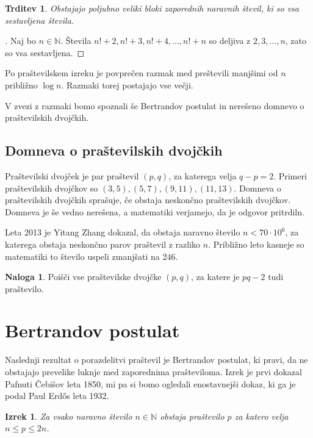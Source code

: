 \documentclass[a4paper,12pt]{article}
\def\N{\mathbb{N}}
\theoremstyle{definition}
\newtheorem{naloga}{Naloga}
\theoremstyle{plain}
\newtheorem{izrek}{Izrek}
\newtheorem{trditev}{Trditev}
\newenvironment{dokaz}{\begin{proof}[\bfseries\upshape\proofname]}{\end{proof}}
\begin{document}
\begin{trditev}
    Obstajajo poljubno veliki bloki zaporednih naravnih števil, ki so vsa sestavljena števila.
\end{trditev}
\begin{dokaz}
    Naj bo $n \in \N$. Števila $n! + 2, n! + 3, n! + 4, \ldots, n! + n$ so deljiva z $2, 3, \ldots, n$, zato so vsa sestavljena.
\end{dokaz}

Po praštevilskem izreku je povprečen razmak med preštevili manjšimi od $n$ približno $\log{n}$. Razmaki torej postajajo vse večji.

V zvezi z razmaki bomo spoznali še Bertrandov postulat in nerešeno domnevo o praštevilskih dvojčkih.

\subsection{Domneva o praštevilskih dvojčkih}
Praštevilski dvojček je par praštevil $(p, q)$, za katerega velja $q - p = 2$. Primeri praštevilskih dvojčkov so $(3, 5), (5, 7), (9, 11), (11, 13)$. Domneva o praštevilskih dvojčkih sprašuje, če obstaja neskončno praštevilskih dvojčkov. Domneva je še vedno nerešena, a matematiki verjamejo, da je odgovor pritrdiln.

Leta 2013 je Yitang Zhang dokazal, da obstaja naravno število $n < 70 \cdot 10^6$, za katerega obstaja neskončno parov praštevil z razliko $n$. Približno leto kasneje so matematiki to število uspeli zmanjšati na $246$.

\begin{naloga}
    Poišči vse praštevilske dvojčke $(p, q)$, za katere je $pq - 2$ tudi praštevilo.
\end{naloga}






\section{Bertrandov postulat}
Naslednji rezultat o porazdelitvi praštevil je Bertrandov postulat, ki pravi, da ne obstajajo prevelike luknje med zaporednima prašteviloma. Izrek je prvi dokazal Pafnuti Čebišov leta 1850, mi pa si bomo ogledali enostavnejši dokaz, ki ga je podal Paul Erd\H{o}s leta 1932.

\begin{izrek}
    Za vsako naravno število $n \in \N$ obstaja praštevilo $p$ za katero velja $n \leq p \leq 2n$.
\end{izrek}
\end{document}

